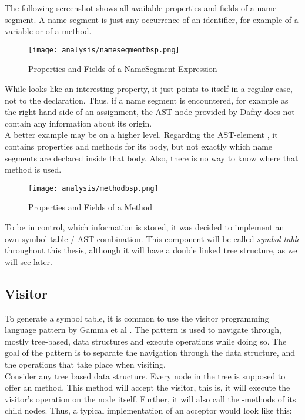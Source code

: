 The following screenshot shows all available properties and fields of a name segment.
A name segment is just any occurrence of an identifier, for example of a variable or of a method.
\begin{figure}[H]
    \centering
    \texttt{[image: analysis/namesegmentbsp.png]}
    \caption{Properties and Fields of a NameSegment Expression}
    \label{fig:namesegment}
\end{figure}
While  looks like an interesting property, it just points to itself in a regular case, not to the declaration.
Thus, if a name segment is encountered, for example as the right hand side of an assignment, the AST node provided by Dafny does not contain any information about its origin.\\

A better example may be on a higher level.
Regarding the AST-element ,
it contains properties and methods for its body, but not exactly which name segments are declared inside that body.
Also, there is no way to know where that method is used.

\begin{figure}[H]
    \centering
    \texttt{[image: analysis/methodbsp.png]}
    \caption{Properties and Fields of a Method}
    \label{fig:method}
\end{figure}

To be in control, which information is stored, it was decided to implement an own symbol table / AST combination.
This component will be called \textit{symbol table} throughout this thesis, although it will have a double linked tree structure, as we will see later.



\subsection{Visitor}
To generate a symbol table, it is common to use the visitor programming language pattern by Gamma et al \cite{gof}. 
The pattern is used to navigate through, mostly tree-based, data structures and execute operations while doing so.
The goal of the pattern is to separate the navigation through the data structure, and the operations that take place when visiting.\\

Consider any tree based data structure.
Every node in the tree is supposed to offer an  method.
This method will accept the visitor, this is, it will execute the visitor's operation on the node itself.
Further, it will also call the -methods of its child nodes.
Thus, a typical implementation of an acceptor would look like this:

